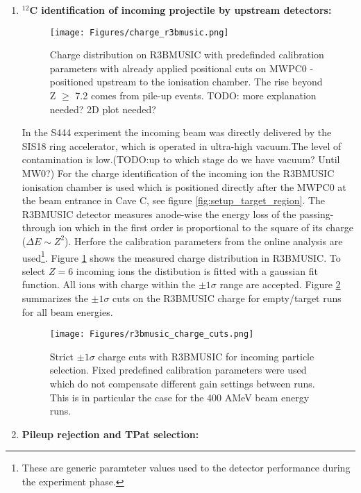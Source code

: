 \begin{enumerate}
\item \textbf{$^{12}$C identification of incoming projectile by upstream detectors:}\newline
\begin{figure}[htpb]
    \centering
    \texttt{[image: Figures/charge\_r3bmusic.png]}
    \caption{
    Charge distribution on R3BMUSIC with predefinded calibration parameters with already applied positional cuts on MWPC0 - positioned upstream to the ionisation chamber. The rise beyond Z $\ge$ 7.2 comes from pile-up events. TODO: more explanation needed? 2D plot needed? 
    }
    \label{fig:r3bmusic_charge}
\end{figure}
In the S444 experiment the incoming beam was directly delivered by the SIS18 ring accelerator, which is operated in ultra-high vacuum.The level of contamination is low.(TODO:up to which stage do we have vacuum? Until MW0?)\newline %
For the charge identification of the incoming ion the R3BMUSIC ionisation chamber is used which is positioned directly after the MWPC0 at the beam entrance in Cave C, see figure \ref{fig:setup_target_region}. The R3BMUSIC detector measures anode-wise the energy loss of the passing-through ion which in the first order is proportional to the square of its charge ($\Delta E \sim Z^{2}$). Herfore the calibration parameters from the online analysis are used\footnote{These are generic paramteter values used to the detector performance during the experiment phase.}. Figure \ref{fig:r3bmusic_charge} shows the measured charge distribution in R3BMUSIC. To select $Z = 6$ incoming ions the distibution is fitted with a gaussian fit function. All ions with charge within the $\pm 1 \sigma$ range are accepted. Figure \ref{fig:r3bmusic_cuts} summarizes the $\pm 1 \sigma$ cuts on the R3BMUSIC charge for empty/target runs for all beam energies.   
\begin{figure}
\centering
\texttt{[image: Figures/r3bmusic\_charge\_cuts.png]}
\caption{Strict $\pm 1 \sigma$ charge cuts with R3BMUSIC for incoming particle selection. Fixed predefined calibration parameters were used which do not compensate different gain settings between runs. This is in particular the case for the 400 AMeV beam energy runs.}
\label{fig:r3bmusic_cuts}
\end{figure}
\item \textbf{Pileup rejection and TPat selection:}\newline

\end{enumerate}
